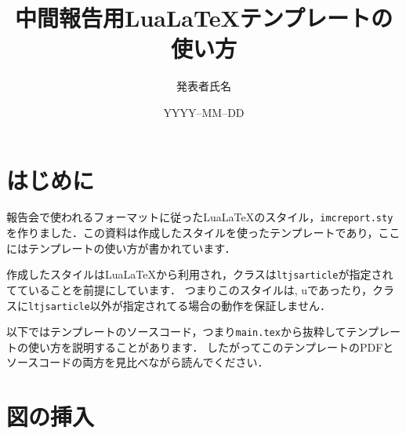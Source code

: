\documentclass[10pt,a4j,twocolumn]{ltjsarticle}
\title{中間報告用Lua\LaTeX テンプレートの使い方} %
\author{発表者氏名}                              %
\date{YYYY--MM--DD}                              %
\begin{document}
\maketitle %

\section{はじめに}

報告会で使われるフォーマットに従ったLua\LaTeX のスタイル，\verb|imcreport.sty|を作りました．この資料は作成したスタイルを使ったテンプレートであり，ここにはテンプレートの使い方が書かれています．

作成したスタイルはLua\LaTeX から利用され，クラスは\verb|ltjsarticle|が指定されてていることを前提にしています．
つまりこのスタイルは\pLaTeX, u\pLaTeX であったり，クラスに\verb|ltjsarticle|以外が指定されてる場合の動作を保証しません．

以下ではテンプレートのソースコード，つまり\verb|main.tex|から抜粋してテンプレートの使い方を説明することがあります．
したがってこのテンプレートのPDFとソースコードの両方を見比べながら読んでください．

\section{図の挿入}
\end{document}
